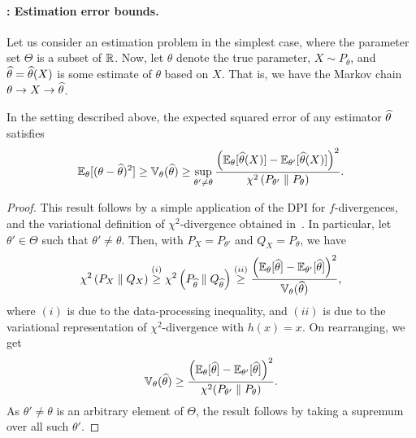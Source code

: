         \paragraph{: Estimation error bounds.} Let us consider an estimation problem in the simplest case, where the parameter set $\Theta$ is a subset of $\mathbb{R}$. Now, let $\theta$ denote the true parameter, $X \sim P_{\theta}$, and $\widehat{\theta} = \widehat{\theta}(X)$ is some estimate of $\theta$ based on $X$. That is, we have the Markov chain $\theta \rightarrow X \rightarrow \widehat{\theta}$. 
        \begin{proposition}
        \label{prop:hammersley}
             In the setting described above, the expected squared error of any estimator $\widehat{\theta}$ satisfies 
            \begin{align}
                \mathbb{E}_{\theta} [(\theta - \widehat{\theta})^2] \geq \mathbb{V}_{\theta}(\widehat{\theta}) \geq \sup_{\theta' \neq \theta} \frac{ \left( \mathbb{E}_{\theta}[\widehat{\theta}(X)] -  \mathbb{E}_{\theta'}[\widehat{\theta}(X)]\right)^2}{\chi^2\left( P_{\theta'} \parallel P_{\theta} \right)}.  
            \end{align}           
        \end{proposition}
        \begin{proof}
            This result follows by a simple application of the DPI for $f$-divergences, and the variational definition of $\chi^2$-divergence obtained in~. In particular, let $\theta' \in \Theta$ such that $\theta' \neq \theta$. Then, with $P_X = P_{\theta'}$ and $Q_X=P_{\theta}$, we have
            \begin{align}
             \chi^2\left( P_X \parallel Q_X  \right) \stackrel{(i)}{\geq}   \chi^2\left( P_{\widehat{\theta}} \parallel Q_{\widehat{\theta}}  \right) \stackrel{(ii)}{\geq} \frac{ \left( \mathbb{E}_{\theta}[\widehat{\theta}] - \mathbb{E}_{\theta'}[\widehat{\theta}] \right)^2}{\mathbb{V}_{\theta}(\widehat{\theta})},  
            \end{align}
            where $(i)$ is due to the data-processing inequality, and $(ii)$ is due to the variational representation of $\chi^2$-divergence with $h(x) = x$.  On rearranging, we get 
            \begin{align}
                \mathbb{V}_{\theta}(\widehat{\theta}) \geq \frac{ \left( \mathbb{E}_{\theta}[\widehat{\theta}] - \mathbb{E}_{\theta'}[\widehat{\theta}] \right)^2}{\chi^2(P_{\theta'} \parallel P_{\theta})}.   
            \end{align}
            As $\theta' \neq \theta$ is an arbitrary element of $\Theta$, the result follows by taking a supremum over all such $\theta'$. 
        \end{proof}
